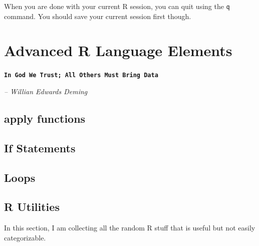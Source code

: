 \documentclass[10pt, letterpaper, twoside]{memoir}\usepackage{knitr}
\newcommand{\chapterendsymbol}{
    \vspace{24pt}
    \Huge
    \hrulefill \hspace{0.1in} \hspace{0.1in} \hrulefill
    \normalsize
    }
\begin{document}
When you are done with your current R session, you can quit using the \texttt{q} command. You should save your current session first though.
\begin{knitrout}
\color{fgcolor}\begin{kframe}
\begin{alltt}
\hlstd{(} \hlstd{=} \hlstd{)}
\hlstd{()}
\end{alltt}
\end{kframe}
\end{knitrout}



\chapterendsymbol





\chapter{Advanced R Language Elements}

\begin{flushright}

\textbf{\texttt{In God We Trust; All Others Must Bring Data}}

\emph{-- Willian Edwards Deming}

\end{flushright}

\vspace{12pt}

\section{apply functions}

\section{If Statements}

\section{Loops}

\section{R Utilities}

In this section, I am collecting all the random R stuff that is useful but not easily categorizable.
\end{document}
